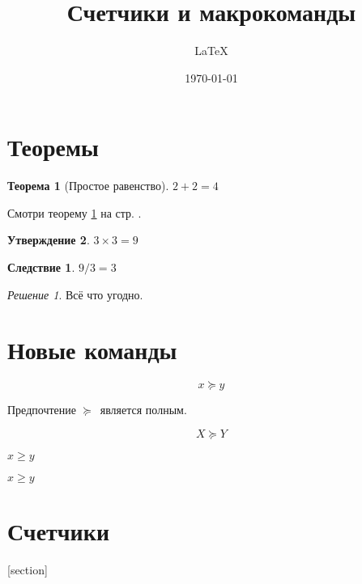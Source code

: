 \documentclass[a4paper,12pt]{article}
\author{\LaTeX{}}
\title{Счетчики и макрокоманды}
\date{\today}
\theoremstyle{plain} %
\newtheorem{theorem}{Теорема}[section]
\newtheorem{proposition}[theorem]{Утверждение}
\theoremstyle{definition} %
\newtheorem{corollary}{Следствие}[theorem]
\theoremstyle{remark} %
\newtheorem*{nonum}{Решение}
\begin{document}

\maketitle

\section{Теоремы}

\begin{theorem}[Простое равенство]\label{theorem1}
	$2+2=4$
\end{theorem}

Смотри теорему \ref{theorem1} на стр. \pageref{theorem1}.

\begin{proposition}
	$3\times 3 = 9$
\end{proposition}

\begin{corollary}
	$9/3 = 3$
\end{corollary}

\begin{nonum}
	Всё что угодно.
\end{nonum}

\section{Новые команды}

\newcommand{\nw}{\ensuremath{\succcurlyeq}}

\begin{equation}\label{pref}
	x \nw y
\end{equation}

Предпочтение \nw\ является полным.

\newcommand{\str}[1]{%
на стр. \pageref{#1}%
}

\newcommand{\qwerty}[2][X]{
\begin{equation}
	#1 \nw #2
\end{equation}
}

\qwerty{Y}

$x\ge y$

\renewcommand{\ge}{\geqslant}

$x\ge y$

\section{Счетчики}

[section]
\end{document}
